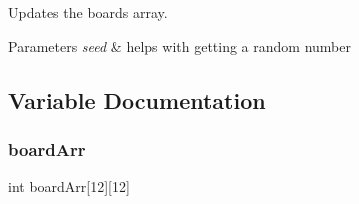 Updates the board\textquotesingle{}s array. 


\begin{DoxyParams}{Parameters}
{\em seed} & helps with getting a random number \\
\hline
\end{DoxyParams}


\subsection{Variable Documentation}
\mbox{\label{group__board_ga71c192646429486a7ac23c7805a8ed6c}} 
\subsubsection{\texorpdfstring{boardArr}{boardArr}}
{\footnotesize\ttfamily int board\+Arr\mbox{[}12\mbox{]}\mbox{[}12\mbox{]}}

